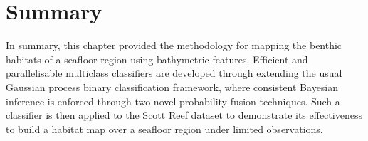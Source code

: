 	\section{Summary}
	\label{BenthicHabitatMapping:Summary}
	
		In summary, this chapter provided the methodology for mapping the benthic habitats of a seafloor region using bathymetric features. Efficient and parallelisable multiclass classifiers are developed through extending the usual Gaussian process binary classification framework, where consistent Bayesian inference is enforced through two novel probability fusion techniques. Such a classifier is then applied to the Scott Reef dataset to demonstrate its effectiveness to build a habitat map over a seafloor region under limited observations.
		